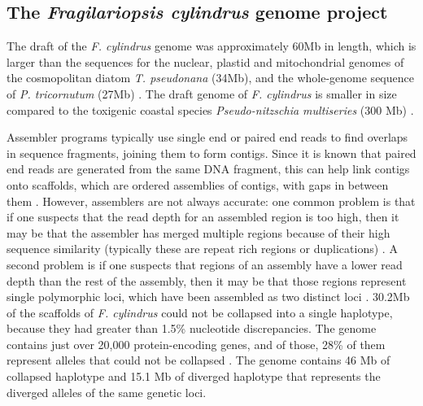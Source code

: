 \subsection{The \textit{Fragilariopsis cylindrus} genome project}

The draft of the \textit{F. cylindrus} genome was approximately 60Mb in length,
which is larger than the sequences for the nuclear, plastid and mitochondrial
genomes of the cosmopolitan diatom \textit{T. pseudonana} (34Mb), and the
whole-genome sequence of \textit{P. tricornutum} (27Mb)
\parencite{Armbrust2009,OurFCPaper}.
The draft genome of \textit{F. cylindrus} is smaller in size compared to the
toxigenic coastal species \textit{Pseudo-nitzschia multiseries} (300 Mb)
\parencite{Armbrust2009}.

Assembler programs typically use single end or paired end reads to find overlaps in sequence fragments, joining them to form contigs.
Since it is known that paired end reads are generated from the same DNA fragment, this can help link contigs onto scaffolds, which are ordered assemblies of contigs, with gaps in between them \parencite{Baker2012}.
However, assemblers are not always accurate: one common problem is that if one suspects that the read depth for an assembled region is too high, then it may be that the assembler has merged multiple regions because of their high sequence similarity (typically these are repeat rich regions or duplications) \parencite{Baker2012}.
A second problem is if one suspects that regions of an assembly have a lower read depth than the rest of the assembly, then it may be that those regions represent single polymorphic loci, which have been assembled as two distinct loci \parencite{Baker2012}.
30.2Mb of the scaffolds of \textit{F. cylindrus} could not be collapsed into a single haplotype, because they had greater than 1.5\% nucleotide discrepancies.
The genome contains just over 20,000 protein-encoding genes, and of those, 28\% of them represent alleles that could not be collapsed \parencite{Mock2017}.
The genome contains 46 Mb of collapsed haplotype and 15.1 Mb of diverged haplotype that represents the diverged alleles of the same genetic loci.

